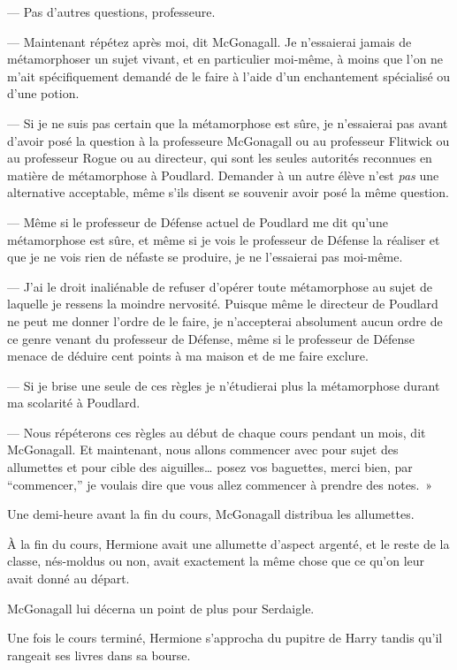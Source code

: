 --- Pas d'autres questions, professeure.

--- Maintenant répétez après moi, dit McGonagall.
Je n'essaierai jamais de métamorphoser un sujet vivant, et en particulier moi-même, à moins que l'on ne m'ait spécifiquement demandé de le faire à l'aide d'un enchantement spécialisé ou d'une potion.

--- Si je ne suis pas certain que la métamorphose est sûre, je n'essaierai pas avant d'avoir posé la question à la professeure McGonagall ou au professeur Flitwick ou au professeur Rogue ou au directeur, qui sont les seules autorités reconnues en matière de métamorphose à Poudlard.
Demander à un autre élève n'est \emph{pas} une alternative acceptable, même s'ils disent se souvenir avoir posé la même question.

--- Même si le professeur de Défense actuel de Poudlard me dit qu'une métamorphose est sûre, et même si je vois le professeur de Défense la réaliser et que je ne vois rien de néfaste se produire, je ne l'essaierai pas moi-même.

--- J'ai le droit inaliénable de refuser d'opérer toute métamorphose au sujet de laquelle je ressens la moindre nervosité.
Puisque même le directeur de Poudlard ne peut me donner l'ordre de le faire, je n'accepterai absolument aucun ordre de ce genre venant du professeur de Défense, même si le professeur de Défense menace de déduire cent points à ma maison et de me faire exclure.

--- Si je brise une seule de ces règles je n'étudierai plus la métamorphose durant ma scolarité à Poudlard.

--- Nous répéterons ces règles au début de chaque cours pendant un mois, dit McGonagall.
Et maintenant, nous allons commencer avec pour sujet des allumettes et pour cible des aiguilles… posez vos baguettes, merci bien, par “commencer,” je voulais dire que vous allez commencer à prendre des notes.~»

Une demi-heure avant la fin du cours, McGonagall distribua les allumettes.

À la fin du cours, Hermione avait une allumette d'aspect argenté, et le reste de la classe, nés-moldus ou non, avait exactement la même chose que ce qu'on leur avait donné au départ.

McGonagall lui décerna un point de plus pour Serdaigle.

\later

Une fois le cours terminé, Hermione s'approcha du pupitre de Harry tandis qu'il rangeait ses livres dans sa bourse.


